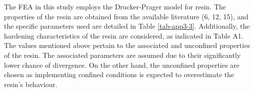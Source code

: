 \begin{table}[htbp]
    \centering
    \caption{Material properties}\label{tab-app3-2}
\end{table}

The FEA in this study employs the Drucker-Prager model for resin. The properties of the resin are obtained from the available literature (6, 12, 15), and the specific parameters used are detailed in Table \ref{tab-app3-3}. Additionally, the hardening characteristics of the resin are considered, as indicated in Table A1. The values mentioned above pertain to the associated and unconfined properties of the resin. The associated parameters are assumed due to their significantly lower chance of divergence. On the other hand, the unconfined properties are chosen as implementing confined conditions is expected to overestimate the resin's behaviour. 


